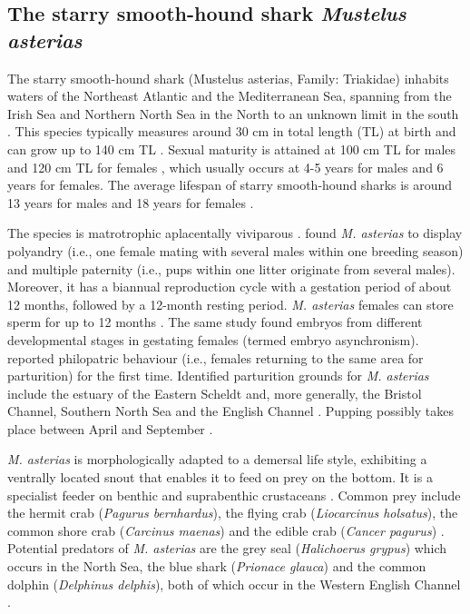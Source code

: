 \documentclass[
  authoryear,
  review,
  3p]{elsarticle}
\begin{document}
\hypertarget{the-starry-smooth-hound-shark-mustelus-asterias}{%
\subsection{\texorpdfstring{The starry smooth-hound shark \emph{Mustelus
asterias}}{The starry smooth-hound shark Mustelus asterias}}\label{the-starry-smooth-hound-shark-mustelus-asterias}}

The starry smooth-hound shark (Mustelus asterias, Family: Triakidae)
inhabits waters of the Northeast Atlantic and the Mediterranean Sea,
spanning from the Irish Sea and Northern North Sea in the North to an
unknown limit in the south \citep{ices_2022}. This species typically
measures around 30 cm in total length (TL) at birth and can grow up to
140 cm TL \citep{mccullyphillips_2015}. Sexual maturity is attained at
100 cm TL for males and 120 cm TL for females \citep{farrell_2010},
which usually occurs at 4-5 years for males and 6 years for females. The
average lifespan of starry smooth-hound sharks is around 13 years for
males and 18 years for females \citep{farrell_2010}.

The species is matrotrophic aplacentally viviparous \citep[i.e., embryos
absorb nutrients from a yolk sack that is used up during
gestation,][]{farrell_2010a, mccullyphillips_2015}. \citet{farrell_2014}
found \emph{M. asterias} to display polyandry (i.e., one female mating
with several males within one breeding season) and multiple paternity
(i.e., pups within one litter originate from several males). Moreover,
it has a biannual reproduction cycle with a gestation period of about 12
months, followed by a 12-month resting period. \emph{M. asterias}
females can store sperm for up to 12 months \citep{farrell_2010a}. The
same study found embryos from different developmental stages in
gestating females (termed embryo asynchronism). \citet{griffiths_2020}
reported philopatric behaviour (i.e., females returning to the same area
for parturition) for the first time. Identified parturition grounds for
\emph{M. asterias} include the estuary of the Eastern Scheldt and, more
generally, the Bristol Channel, Southern North Sea and the English
Channel \citep{dureuil_2013, mccullyphillips_2015, breve_2016}. Pupping
possibly takes place between April and September
\citep{farrell_2010a, mccullyphillips_2015}.

\emph{M. asterias} is morphologically adapted to a demersal life style,
exhibiting a ventrally located snout that enables it to feed on prey on
the bottom. It is a specialist feeder on benthic and suprabenthic
crustaceans \citep{mccullyphillips_2020, bitonporsmoguer_2022}. Common
prey include the hermit crab (\emph{Pagurus bernhardus}), the flying
crab (\emph{Liocarcinus holsatus}), the common shore crab
(\emph{Carcinus maenas}) and the edible crab (\emph{Cancer pagurus})
\citep{mccullyphillips_2015, mccullyphillips_2020}. Potential predators
of \emph{M. asterias} are the grey seal (\emph{Halichoerus grypus})
which occurs in the North Sea, the blue shark (\emph{Prionace glauca})
and the common dolphin (\emph{Delphinus delphis}), both of which occur
in the Western English Channel \citep{griffiths_2020}.
\end{document}

